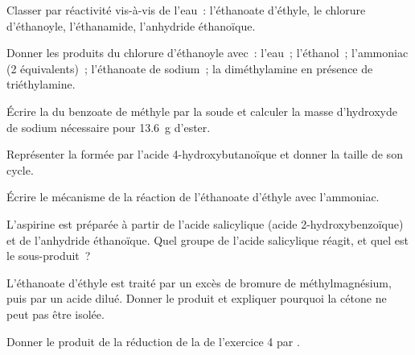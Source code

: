 \begin{exercise}[$\star$]\label{exo:b2:acyl-substitution:1}
Classer par réactivité vis-à-vis de l'eau~: l'éthanoate d'éthyle, le chlorure d'éthanoyle,
l'éthanamide, l'anhydride éthanoïque.
\end{exercise}

\begin{exercise}[$\star$]\label{exo:b2:acyl-substitution:2}
Donner les produits du chlorure d'éthanoyle avec~: l'eau~; l'éthanol~; l'ammoniac (2 équivalents)~;
l'éthanoate de sodium~; la diméthylamine en présence de triéthylamine.
\end{exercise}

\begin{exercise}[$\star$]\label{exo:b2:acyl-substitution:3}
Écrire la  du benzoate de méthyle par la soude et calculer la masse d'hydroxyde de
sodium nécessaire pour \qty{13.6}{g} d'ester.
\end{exercise}

\begin{exercise}[$\star$]\label{exo:b2:acyl-substitution:4}
Représenter la  formée par l'acide 4-hydroxybutanoïque et donner la taille de son cycle.
\end{exercise}

\begin{exercise}[$\star\star$]\label{exo:b2:acyl-substitution:5}
Écrire le mécanisme de la réaction de l'éthanoate d'éthyle avec l'ammoniac.
\end{exercise}

\begin{exercise}[$\star\star$]\label{exo:b2:acyl-substitution:6}
L'aspirine est préparée à partir de l'acide salicylique (acide 2-hydroxybenzoïque) et de l'anhydride
éthanoïque. Quel groupe de l'acide salicylique réagit, et quel est le sous-produit~?
\end{exercise}

\begin{exercise}[$\star\star$]\label{exo:b2:acyl-substitution:7}
L'éthanoate d'éthyle est traité par un excès de bromure de méthylmagnésium, puis par un acide dilué.
Donner le produit et expliquer pourquoi la cétone ne peut pas être isolée.
\end{exercise}

\begin{exercise}[$\star\star$]\label{exo:b2:acyl-substitution:8}
Donner le produit de la réduction de la  de l'exercice 4 par .
\end{exercise}

